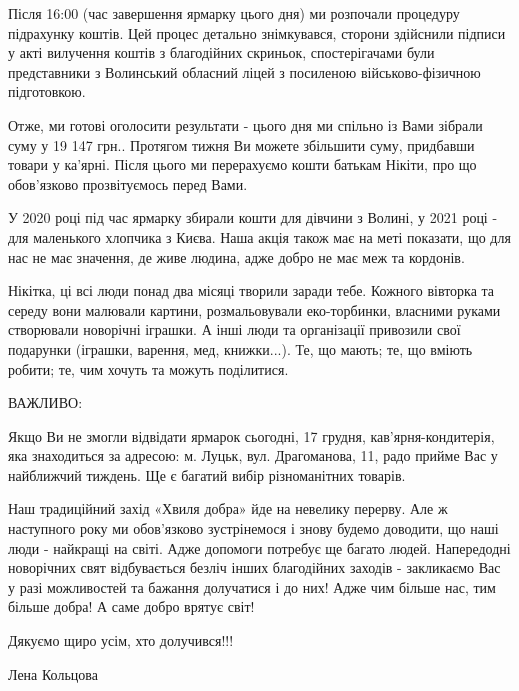 Після 16:00 (час завершення ярмарку цього дня) ми розпочали процедуру
підрахунку коштів. Цей процес детально знімкувався, сторони здійснили підписи у
акті вилучення коштів з благодійних скриньок, спостерігачами були представники
з Волинський обласний ліцей з посиленою військово-фізичною підготовкою.


Отже, ми готові оголосити результати - цього дня ми спільно із Вами зібрали
суму у 19 147 грн.. Протягом тижня Ви можете збільшити суму, придбавши товари у
ка'ярні. Після цього ми перерахуємо кошти батькам Нікіти, про що обов'язково
прозвітуємось перед Вами.

У 2020 році під час ярмарку збирали кошти для дівчини з Волині, у 2021 році -
для маленького хлопчика з Києва. Наша акція також має на меті показати, що для
нас не має значення, де живе людина, адже добро не має меж та кордонів.


Нікітка, ці всі люди понад два місяці творили заради тебе. Кожного вівторка та
середу вони малювали картини, розмальовували еко-торбинки, власними руками
створювали новорічні іграшки. А інші люди та організації привозили свої
подарунки (іграшки, варення, мед, книжки...). Те, що мають; те, що вміють
робити; те, чим хочуть та можуть поділитися.

ВАЖЛИВО:

Якщо Ви не змогли відвідати ярмарок сьогодні, 17 грудня, кав’ярня-кондитерія,
яка знаходиться за адресою: м. Луцьк, вул. Драгоманова, 11, радо прийме Вас у
найближчий тиждень. Ще є багатий вибір різноманітних товарів.

Наш традиційний захід «Хвиля добра» йде на невелику перерву. Але ж наступного
року ми обов'язково зустрінемося і знову будемо доводити, що наші люди -
найкращі на світі. Адже допомоги потребує ще багато людей. Напередодні
новорічних свят відбувається безліч інших благодійних заходів - закликаємо Вас
у разі можливостей та бажання долучатися і до них! Адже чим більше нас, тим
більше добра! А саме добро врятує світ!

Дякуємо щиро усім, хто долучився!!!

Лена Кольцова
